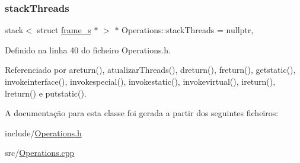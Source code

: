 \subsubsection{\texorpdfstring{stack\+Threads}{stackThreads}}
{\footnotesize\ttfamily stack$<$ struct \hyperlink{structframe__s}{frame\+\_\+s} $\ast$ $>$ $\ast$ Operations\+::stack\+Threads = nullptr\hspace{0.3cm}{\ttfamily [static]}, {\ttfamily [private]}}



Definido na linha 40 do ficheiro Operations.\+h.



Referenciado por areturn(), atualizar\+Threads(), dreturn(), freturn(), getstatic(), invokeinterface(), invokespecial(), invokestatic(), invokevirtual(), ireturn(), lreturn() e putstatic().



A documentação para esta classe foi gerada a partir dos seguintes ficheiros\+:\begin{DoxyCompactItemize}
\item 
include/\hyperlink{Operations_8h}{Operations.\+h}\item 
src/\hyperlink{Operations_8cpp}{Operations.\+cpp}\end{DoxyCompactItemize}
